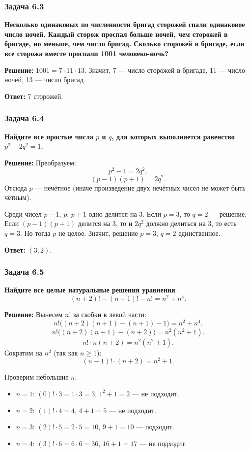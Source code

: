 \documentclass[12pt, a4paper]{article}
\begin{document}
\subsubsection*{Задача 6.3}
\textbf{Несколько одинаковых по численности бригад сторожей спали одинаковое число ночей. Каждый сторож проспал больше ночей, чем сторожей в бригаде, но меньше, чем число бригад. Сколько сторожей в бригаде, если все сторожа вместе проспали 1001 человеко-ночь?}

\textbf{Решение:}
$1001 = 7 \cdot 11 \cdot 13$. Значит, 7 — число сторожей в бригаде, 11 — число ночей, 13 — число бригад.

\textbf{Ответ:} 7 сторожей.

\subsubsection*{Задача 6.4}
\textbf{Найдите все простые числа $p$ и $q$, для которых выполняется равенство $p^2 - 2q^2 = 1$.}

\textbf{Решение:}
Преобразуем:
\[
p^2 - 1 = 2q^2,
\]
\[
(p-1)(p+1) = 2q^2.
\]
Отсюда $p$ — нечётное (иначе произведение двух нечётных чисел не может быть чётным).

Среди чисел $p-1$, $p$, $p+1$ одно делится на 3. Если $p = 3$, то $q = 2$ — решение. Если $(p-1)(p+1)$ делится на 3, то и $2q^2$ должно делиться на 3, то есть $q = 3$. Но тогда $p$ не целое. Значит, решение $p = 3$, $q = 2$ единственное.

\textbf{Ответ:} $(3; 2)$.

\subsubsection*{Задача 6.5}
\textbf{Найдите все целые натуральные решения уравнения}
\[
(n+2)! - (n+1)! - n! = n^2 + n^4.
\]

\textbf{Решение:}
Вынесем $n!$ за скобки в левой части:
\[
n! \bigl((n+2)(n+1) - (n+1) - 1\bigr) = n^2 + n^4.
\]
\[
n! \bigl((n+2)(n+1) - (n+2)\bigr) = n^2(n^2 + 1).
\]
\[
n! \cdot n(n+2) = n^2(n^2 + 1).
\]
Сократим на $n^2$ (так как $n \ge 1$):
\[
(n-1)! \cdot (n+2) = n^2 + 1.
\]

Проверим небольшие $n$:
\begin{itemize}
    \item $n = 1$: $(0)! \cdot 3 = 1 \cdot 3 = 3$, $1^2 + 1 = 2$ — не подходит.
    \item $n = 2$: $(1)! \cdot 4 = 4$, $4 + 1 = 5$ — не подходит.
    \item $n = 3$: $(2)! \cdot 5 = 2 \cdot 5 = 10$, $9 + 1 = 10$ — подходит.
    \item $n = 4$: $(3)! \cdot 6 = 6 \cdot 6 = 36$, $16 + 1 = 17$ — не подходит.
\end{itemize}
\end{document}
